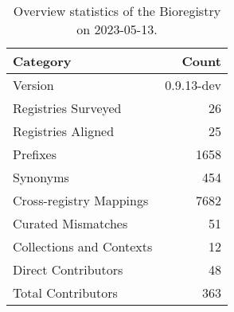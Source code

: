 \begin{table}
\caption{Overview statistics of the Bioregistry on 2023-05-13.}
\label{tab:bioregistry-summary}
\begin{tabular}{lr}
\toprule
Category & Count \\
\midrule
Version & 0.9.13-dev \\
Registries Surveyed & 26 \\
Registries Aligned & 25 \\
Prefixes & 1658 \\
Synonyms & 454 \\
Cross-registry Mappings & 7682 \\
Curated Mismatches & 51 \\
Collections and Contexts & 12 \\
Direct Contributors & 48 \\
Total Contributors & 363 \\
\bottomrule
\end{tabular}
\end{table}
